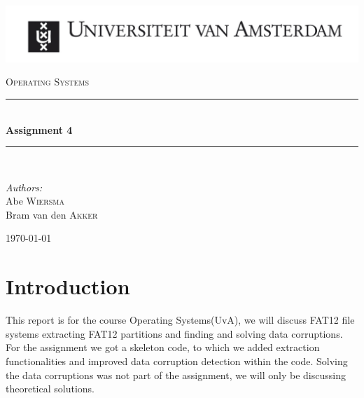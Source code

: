 \documentclass[pdftex,12pt,a4paper]{article}
\newcommand{\HRule}{\rule{\linewidth}{0.5mm}}
\begin{document}
\begin{titlepage}

\begin{flushleft}
\includegraphics[trim=23mm 0mm 0mm 0mm, width=1.2\textwidth]{./logo}\\[1cm]   
\end{flushleft}
\begin{center}
\textsc{\Large Operating Systems}\\[0.5cm]


\HRule \\[0.4cm]
{ \huge \bfseries Assignment 4}\\[0.4cm]

\HRule \\[1.5cm]

\begin{minipage}{0.4\textwidth}
\begin{flushleft} \large
\emph{Authors:}\\
 Abe \textsc{Wiersma}\\
 Bram van den \textsc{Akker}
\end{flushleft}
\end{minipage}
\begin{minipage}{0.4\textwidth}
\begin{flushright} \large
\end{flushright}
\end{minipage}

\vfill

{\large \today}

\end{center}
\end{titlepage}
\pagebreak

\tableofcontents
\pagebreak
\section{Introduction}
This report is for the course Operating Systems(UvA), we will discuss FAT12 file systems extracting FAT12 partitions and finding and solving data corruptions. For the assignment we got a skeleton code, to which we added extraction functionalities and improved data corruption detection within the code. Solving the data corruptions was not part of the assignment, we will only be discussing theoretical solutions.
\end{document}
